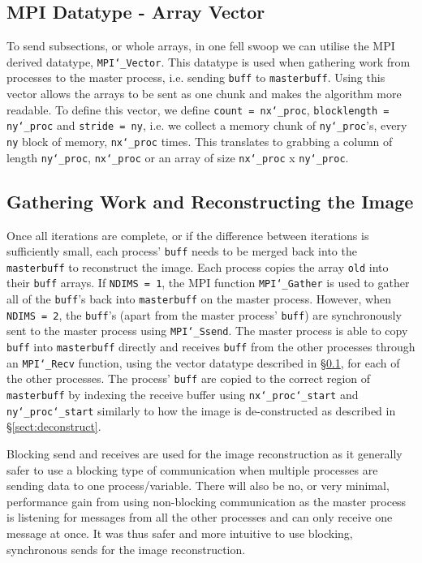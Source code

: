 \documentclass[11pt, a4paper]{article}
\begin{document}
		\subsection{MPI Datatype - Array Vector} \label{sect:array_vector}
			To send subsections, or whole arrays, in one fell swoop we can utilise the MPI derived datatype, \texttt{MPI\char`_Vector}. This datatype is used when gathering work from processes to the master process, i.e. sending \texttt{buff} to \texttt{masterbuff}. Using this vector allows the arrays to be sent as one chunk and makes the algorithm more readable. To define this vector, we define \texttt{count = nx\char`_proc}, \texttt{blocklength = ny\char`_proc} and \texttt{stride = ny}, i.e. we collect a memory chunk of \texttt{ny\char`_proc}'s, every \texttt{ny} block of memory, \texttt{nx\char`_proc} times. This translates to grabbing a column of length \texttt{ny\char`_proc}, \texttt{nx\char`_proc} or an array of size \texttt{nx\char`_proc} x \texttt{ny\char`_proc}.	
		
		\subsection{Gathering Work and Reconstructing the Image} \label{sect:reconstruct}
			Once all iterations are complete, or if the difference between iterations is sufficiently small, each process' \texttt{buff} needs to be merged back into the \texttt{masterbuff} to reconstruct the image. Each process copies the array \texttt{old} into their \texttt{buff} arrays. If \texttt{NDIMS = 1}, the MPI function \texttt{MPI\char`_Gather} is used to gather all of the \texttt{buff}'s back into \texttt{masterbuff} on the master process. However, when \texttt{NDIMS = 2}, the \texttt{buff}'s (apart from the master process' \texttt{buff}) are synchronously sent to the master process using \texttt{MPI\char`_Ssend}. The master process is able to copy \texttt{buff} into \texttt{masterbuff} directly and receives \texttt{buff} from the other processes through an \texttt{MPI\char`_Recv} function, using the vector datatype described in \S\ref{sect:array_vector}, for each of the other processes. The process' \texttt{buff} are copied to the correct region of \texttt{masterbuff} by indexing the receive buffer using \texttt{nx\char`_proc\char`_start} and \texttt{ny\char`_proc\char`_start} similarly to how the image is de-constructed as described in \S\ref{sect:deconstruct}.
			
			Blocking send and receives are used for the image reconstruction as it generally safer to use a blocking type of communication when multiple processes are sending data to one process/variable. There will also be no, or very minimal, performance gain from using non-blocking communication as the master process is listening for messages from all the other processes and can only receive one message at once. It was thus safer and more intuitive to use blocking, synchronous sends for the image reconstruction.
\end{document}
